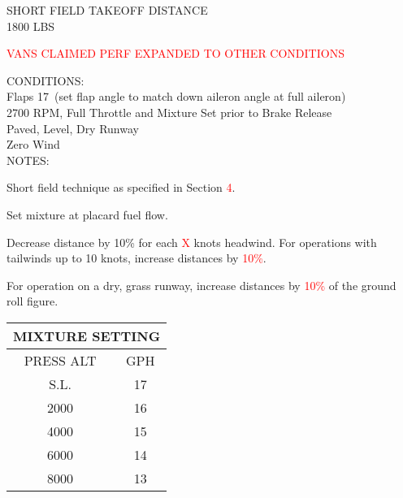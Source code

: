 \begin{sidewaysfigure}[t]
\begin{center}
\begin{perfhdr}SHORT FIELD TAKEOFF DISTANCE\\
1800 LBS
\end{perfhdr}
\Large
\textcolor{red}{VANS CLAIMED PERF EXPANDED TO OTHER CONDITIONS}\vspace{1ex}\\
\normalsize 
\begin{minipage}{7.5in}
  \begin{flushleft}
    CONDITIONS:\\
    Flaps 17\textdegree \ (set flap angle to match down aileron angle at full aileron)\\
    2700 RPM, Full Throttle and Mixture Set prior to Brake Release\\
    Paved, Level, Dry Runway\\
    Zero Wind\\
\vspace{\perfnoteskip}
    NOTES:
    \begin{enumerate*}
      \item Short field technique as specified in Section \textcolor{red}{4}.
      \item Set mixture at placard fuel flow.
      \item Decrease distance by 10\% for each \textcolor{red}{X} knots headwind.  For operations with tailwinds up to 10
      knots, increase distances by \textcolor{red}{10\%}.
      \item For operation on a dry, grass runway, increase distances by \textcolor{red}{10\%} of the ground roll figure.
      \end{enumerate*}
    \end{flushleft}
  \end{minipage}
\hfill
\begin{minipage}{1.5in}
  \begin{tabular}{|c|c|}
    \hline
    \multicolumn{2}{|c|}{MIXTURE SETTING}\\
    \hline
    PRESS ALT&GPH\\
    \hline
    S.L.&17\\
    2000&16\\
    4000&15\\
    6000&14\\
    8000&13\\
    \hline
    \end{tabular}
  \end{minipage}
\\


\end{center}
\end{sidewaysfigure}
